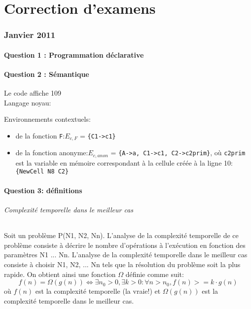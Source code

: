 \newpage
\part*{Correction d'examens}
\section*{Janvier 2011}
\subsection*{Question 1 : Programmation déclarative}


\subsection*{Question 2 : Sémantique}

Le code affiche 109\\
Langage noyau:

Environnements contextuels:
\begin{itemize}
\item de la fonction \lstinline|F|:$E_{c,F}$ = \lstinline|{C1->c1}| 
\item de la fonction anonyme:$E_{c,anon}$ = 
\lstinline|{A->a, C1->c1, C2->c2prim}|, où \lstinline|c2prim| est la variable en mémoire correspondant à la cellule créée à la ligne 10: \lstinline|{NewCell N8 C2}|

\end{itemize}

\subsection*{Question 3: définitions}

\paragraph{Complexité temporelle dans le meilleur cas}
Soit un problème P(N1, N2, Nn). L'analyse de la complexité temporelle de ce problème consiste à décrire le nombre d'opérations à l'exécution en fonction des paramètres N1 ... Nn.
L'analyse de la complexité temporelle dans le meilleur cas consiste à choisir N1, N2, ... Nn tels que la résolution du problème soit la plus rapide. On obtient ainsi une fonction $\Omega$ définie comme suit:
$$ f(n)=\Omega(g(n)) \Leftrightarrow \exists n_0 > 0, \exists k>0: \forall n>n_0, f(n)>= k\cdot g(n) $$
où $f(n)$ est la complexité temporelle (la vraie!)
et $\Omega(g(n))$ est la complexité temporelle dans le meilleur cas.

